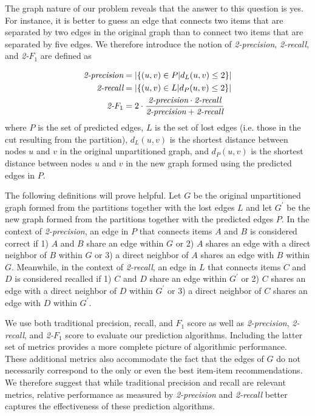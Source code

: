 \documentclass[11pt]{article}
\begin{document}
The graph nature of our problem reveals that the answer to this question is
yes. For instance, it is better to guess an edge that connects two items that
are separated by two edges in the original graph than to connect two items that
are separated by five edges. We therefore introduce the notion of {\em
2-precision}, {\em 2-recall}, and {\em 2-}$F_1$ are defined as

\begin{align}
\text{\em 2-precision} &= \left|\left\{(u,v) \in P | d_L(u,v) \leq 2
\right\}\right|
\\\text{\em 2-recall} &= \left|\left\{(u,v) \in L | d_P(u,v) \leq 2
\right\}\right|
\\\text{\em 2-}F_1 &= 2\cdot \frac{\text{\em 2-precision} \cdot \text{\em
2-recall}}{\text{\em 2-precision} + \text{\em 2-recall}}
\end{align}
where $P$ is the set of predicted edges, $L$ is the set of lost edges (i.e.
those in the cut resulting from the partition), $d_L(u,v)$ is the shortest
distance between nodes $u$ and $v$ in the original unpartitioned graph, and 
$d_P(u,v)$ is the shortest distance between nodes $u$ and $v$ in the new graph 
formed using the predicted edges in $P$.

The following definitions will prove helpful. Let $G$ be the original
unpartitioned graph formed from the partitions together with the lost edges $L$
and let $G^{\prime}$ be the new graph formed from the partitions together with
the predicted edges $P$.  In the context of {\em 2-precision}, an edge in $P$
that connects items $A$ and $B$ is considered correct if 1) $A$ and $B$ share an
edge within $G$ or 2) $A$ shares an edge with a direct neighbor of $B$ within
$G$ or 3) a direct neighbor of $A$ shares an edge with $B$ within $G$.
Meanwhile, in the context of {\em 2-recall}, an edge in $L$ that connects items
$C$ and $D$ is considered recalled if 1) $C$ and $D$ share an edge within
$G^{\prime}$ or 2) $C$ shares an edge with a direct neighbor of $D$ within
$G^{\prime}$ or 3) a direct neighbor of $C$ shares an edge with $D$ within
$G^{\prime}$.

We use both traditional precision, recall, and $F_1$ score as well as {\em
2-precision}, {\em 2-recall}, and {\em 2-}$F_1$ score to evaluate our prediction
algorithms. Including the latter set of metrics provides a more complete picture
of algorithmic performance. These additional metrics also accommodate the fact
that the edges of $G$ do not necessarily correspond to the only or even the best
item-item recommendations. We therefore suggest that while traditional precision
and recall are relevant metrics, relative performance as measured by {\em
2-precision} and {\em 2-recall} better captures the effectiveness of these
prediction algorithms.
\end{document}
